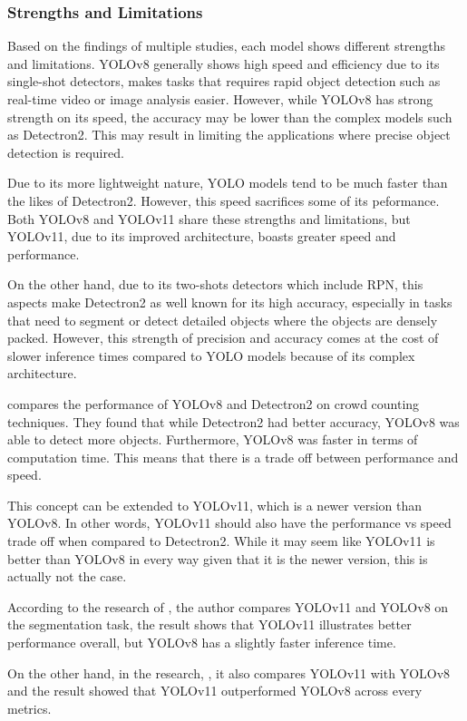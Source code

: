 \documentclass[stu,12pt,floatsintext]{apa7}
\begin{document}
\subsubsection{Strengths and Limitations}
Based on the findings of multiple studies, each model shows different strengths and limitations. YOLOv8 generally shows high speed and efficiency due to its single-shot detectors, makes tasks that requires rapid object detection such as real-time video or image analysis easier. However, while YOLOv8 has strong strength on its speed, the accuracy may be lower than the complex models such as Detectron2. This may result in limiting the applications where precise object detection is required. 

Due to its more lightweight nature, YOLO models tend to be much faster than the likes of Detectron2. However, this speed sacrifices some of its peformance. Both YOLOv8 and YOLOv11 share these strengths and limitations, but YOLOv11, due to its improved architecture, boasts greater speed and performance.

On the other hand, due to its two-shots detectors which include RPN, this aspects make Detectron2 as well known for its high accuracy, especially in tasks that need to segment or detect detailed objects where the objects are densely packed. However, this strength of precision and accuracy comes at the cost of slower inference times compared to YOLO models because of its complex architecture. 

\textcite{wadhwa_comparison_2023} compares the performance of YOLOv8 and Detectron2 on crowd counting techniques. They found that while Detectron2 had better accuracy, YOLOv8 was able to detect more objects. Furthermore, YOLOv8 was faster in terms of computation time. This means that there is a trade off between performance and speed.

This concept can be extended to YOLOv11, which is a newer version than YOLOv8. In other words, YOLOv11 should also have the performance vs speed trade off when compared to Detectron2. While it may seem like YOLOv11 is better than YOLOv8 in every way given that it is the newer version, this is actually not the case.

According to the research of \textcite{Ranjan2024YOLOv8_11Comparison}, the author compares YOLOv11 and YOLOv8 on the segmentation task, the result shows that YOLOv11 illustrates better performance overall, but YOLOv8 has a slightly faster inference time. 

On the other hand, in the research, \textcite{Mujadded2024YOLOv11}, it also compares YOLOv11 with YOLOv8 and the result showed that YOLOv11 outperformed YOLOv8 across every metrics. 
\end{document}
